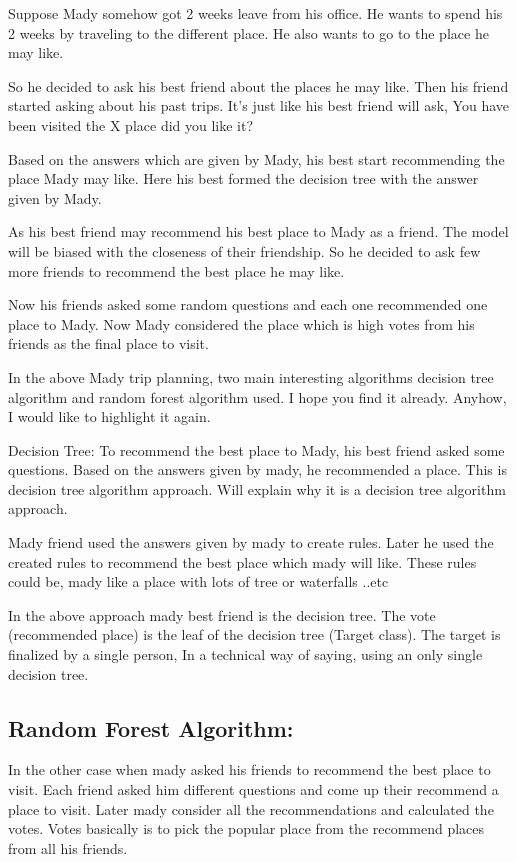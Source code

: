 \documentclass[a4paper,12pt]{article}
\begin{document}
Suppose Mady somehow got 2 weeks leave from his office. He wants to spend his 2 weeks by traveling to the different place. He also wants to go to the place he may like.

So he decided to ask his best friend about the places he may like. Then his friend started asking about his past trips. It’s just like his best friend will ask, You have been visited the X place did you like it?

Based on the answers which are given by Mady, his best start recommending the place Mady may like. Here his best formed the decision tree with the answer given by Mady.

As his best friend may recommend his best place to Mady as a friend. The model will be biased with the closeness of their friendship. So he decided to ask few more friends to recommend the best place he may like.

Now his friends asked some random questions and each one recommended one place to Mady. Now  Mady considered the place which is high votes from his friends as the final place to visit.

In the above Mady trip planning, two main interesting algorithms decision tree algorithm and random forest algorithm used. I hope you find it already. Anyhow, I would like to highlight it again.

Decision Tree:
To recommend the best place to Mady, his best friend asked some questions. Based on the answers given by mady, he recommended a place. This is decision tree algorithm approach. Will explain why it is a decision tree algorithm approach.

Mady friend used the answers given by mady to create rules. Later he used the created rules to recommend the best place which mady will like. These rules could be, mady like a place with lots of tree or waterfalls ..etc

In the above approach mady best friend is the decision tree. The vote (recommended place) is the leaf of the decision tree (Target class). The target is finalized by a single person, In a technical way of saying, using an only single decision tree.

\subsection*{Random Forest Algorithm:}
In the other case when mady asked his friends to recommend the best place to visit. Each friend asked him different questions and come up their recommend a place to visit. Later mady consider all the recommendations and calculated the votes. Votes basically is to pick the popular place from the recommend places from all his friends.
\end{document}
